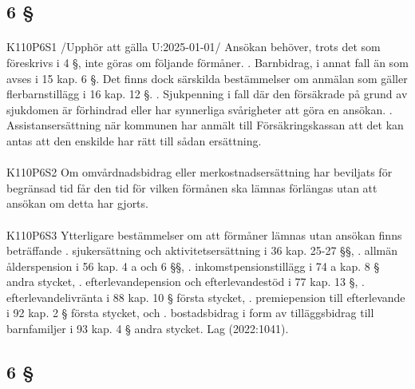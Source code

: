 \documentclass[a4paper,notitlepage,openany,10pt]{book}
\begin{document}
\subsection*{6 §}
\paragraph*{}
{\tiny K110P6S1}
/Upphör att gälla U:2025-01-01/
Ansökan behöver, trots det som föreskrivs i 4 §, inte göras om följande förmåner.
. Barnbidrag, i annat fall än som avses i 15 kap. 6 §. Det finns dock särskilda bestämmelser om anmälan som gäller flerbarnstillägg i 16 kap. 12 §.
. Sjukpenning i fall där den försäkrade på grund av sjukdomen är förhindrad eller har synnerliga svårigheter att göra en ansökan.
. Assistansersättning när kommunen har anmält till Försäkringskassan att det kan antas att den enskilde har rätt till sådan ersättning.
\paragraph*{}
{\tiny K110P6S2}
Om omvårdnadsbidrag eller merkostnadsersättning har beviljats för begränsad tid får den tid för vilken förmånen ska lämnas förlängas utan att ansökan om detta har gjorts.
\paragraph*{}
{\tiny K110P6S3}
Ytterligare bestämmelser om att förmåner lämnas utan ansökan finns beträffande
. sjukersättning och aktivitetsersättning i 36 kap. 25-27 §§,
. allmän ålderspension i 56 kap. 4 a och 6 §§,
. inkomstpensionstillägg i 74 a kap. 8 § andra stycket,
. efterlevandepension och efterlevandestöd i 77 kap. 13 §,
. efterlevandelivränta i 88 kap. 10 § första stycket,
. premiepension till efterlevande i 92 kap. 2 § första stycket, och
. bostadsbidrag i form av tilläggsbidrag till barnfamiljer i 93 kap. 4 § andra stycket.
Lag (2022:1041).
\subsection*{6 §}
\end{document}
